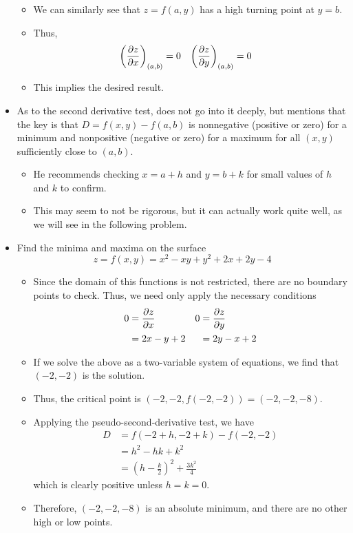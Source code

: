 \documentclass[../main.tex]{subfiles}
\begin{document}
\begin{itemize}
\begin{itemize}
        \item We can similarly see that $z=f(a,y)$ has a high turning point at $y=b$.
        \item Thus,
        \begin{align*}
            \left( \pdv{z}{x} \right)_{(a,b)} &= 0&
                \left( \pdv{z}{y} \right)_{(a,b)} &= 0
        \end{align*}
        \item This implies the desired result.
    \end{itemize}
    \item As to the second derivative test, \textcite{bib:Thomas} does not go into it deeply, but mentions that the key is that $D=f(x,y)-f(a,b)$ is nonnegative (positive or zero) for a minimum and nonpositive (negative or zero) for a maximum for all $(x,y)$ sufficiently close to $(a,b)$.
    \begin{itemize}
        \item He recommends checking $x=a+h$ and $y=b+k$ for small values of $h$ and $k$ to confirm.
        \item This may seem to not be rigorous, but it can actually work quite well, as we will see in the following problem.
    \end{itemize}
    \item Find the minima and maxima on the surface
    \begin{equation*}
        z = f(x,y) = x^2-xy+y^2+2x+2y-4
    \end{equation*}
    \begin{itemize}
        \item Since the domain of this functions is not restricted, there are no boundary points to check. Thus, we need only apply the necessary conditions
        \begin{align*}
            0 &= \pdv{z}{x}&
                0 &= \pdv{z}{y}\\
            &= 2x-y+2&
                &= 2y-x+2
        \end{align*}
        \item If we solve the above as a two-variable system of equations, we find that $(-2,-2)$ is the solution.
        \item Thus, the critical point is $(-2,-2,f(-2,-2))=(-2,-2,-8)$.
        \item Applying the pseudo-second-derivative test, we have
        \begin{align*}
            D &= f(-2+h,-2+k)-f(-2,-2)\\
            &= h^2-hk+k^2\\
            &= \left( h-\frac{k}{2} \right)^2+\frac{3k^2}{4}
        \end{align*}
        which is clearly positive unless $h=k=0$.
        \item Therefore, $(-2,-2,-8)$ is an absolute minimum, and there are no other high or low points.
    \end{itemize}
\end{itemize}
\end{document}
